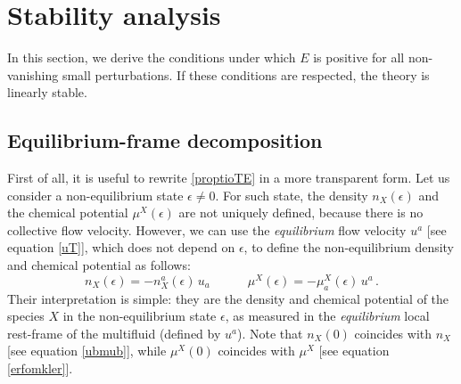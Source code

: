 \documentclass[a4paper, amsfonts, amssymb, amsmath, reprint, showkeys, nofootinbib, twoside, onecolumn,notitlepage]{revtex4-1}
\newcommand{\spc}{\quad \quad \quad}
\theoremstyle{definition}
\theoremstyle{theorem}
\begin{document}
\section{Stability analysis}

In this section, we derive the conditions under which $E$ is positive for all non-vanishing small perturbations. If these conditions are respected, the theory is linearly stable.



\subsection{Equilibrium-frame decomposition}

First of all, it is useful to rewrite \eqref{proptioTE} in a more transparent form. Let us consider a non-equilibrium state $\epsilon \neq 0$. For such state, the density $n_X(\epsilon)$ and the chemical potential $\mu^X(\epsilon)$ are not uniquely defined, because there is no collective flow velocity. However, we can use the \textit{equilibrium} flow velocity $u^a$ [see equation \eqref{uT}], which does not depend on $\epsilon$, to define the non-equilibrium density and chemical potential as follows:
\begin{equation}\label{kmunghiz}
n_X(\epsilon)=-n_X^a(\epsilon) \, u_a  \spc \mu^X(\epsilon)=- \mu^X_a(\epsilon) \,  u^a \, .
\end{equation}
Their interpretation is simple: they are the density and chemical potential of the species $X$ in the non-equilibrium state $\epsilon$, as measured in the \textit{equilibrium} local rest-frame of the multifluid (defined by $u^a$). Note that $n_X(0)$ coincides with $n_X$ [see equation \eqref{ubmub}], while $\mu^X(0)$ coincides with $\mu^X$ [see equation \eqref{erfomkler}].
\end{document}
